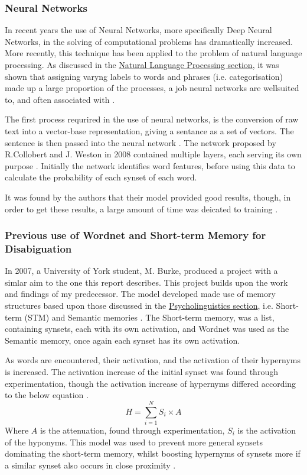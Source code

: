 \documentclass[]{article}
\begin{document}
\subsubsection{Neural Networks}
\label{sec:NeuralNetwork}
In recent years the use of Neural Networks, more specifically Deep Neural Networks, in the solving of computational problems has dramatically increased. More recently, this technique has been applied to the problem of natural language processing. As discussed in the \hyperref[sec:fNLP]{Natural Language Processing section}, it was shown that assigning varyng labels to words and phrases (i.e. categorisation) made up a large proportion of the processes, a job neural networks are wellsuited to, and often associated with \cite{NeuralNetworks}. 

The first process requrired in the use of neural networks, is the conversion of raw text into a vector-base representation, giving a sentance as a set of vectors. The sentence is then passed into the neural network \cite{NeuralNetworks}. The network proposed by R.Collobert and J. Weston in 2008 contained multiple layers, each serving its own purpose \cite{NeuralNetworks}. Initially the network identifies word features, before using this data to calculate the probability of each synset of each word.

It was found by the authors that their model provided good results, though, in order to get these results, a large amount of time was deicated to training \cite{NeuralNetworks}.

\subsubsection{Previous use of Wordnet and Short-term Memory for Disabiguation}
\label{sec:MattBurke}

In 2007, a University of York student, M. Burke, produced a project with a simlar aim to the one this report describes. This project builds upon the work and findings of my predecessor. The model developed made use of memory structures based upon those discussed in the \hyperref[sec:Psycholinguistics]{Psycholinguistics section}, i.e. Short-term (STM) and Semantic memories \cite{MattBurkePrevious}. The Short-term memory, was a list, containing synsets, each with its own activation, and Wordnet was used as the Semantic memory, once again each synset has its own activation.    

As words are encountered, their activation, and the activation of their hypernyms is increased. The activation increase of the initial synset was found through experimentation, though the activation increase of hypernyms differed according to the below equation \cite{MattBurkePrevious}. 
\[H = \sum\limits_{i=1}^N S_i \times A\]
Where \(A\) is the attenuation, found through experimentation, \(S_i\) is the activation of the hyponyms. This model was used to prevent more general synsets dominating the short-term memory, whilst boosting hypernyms of synsets more if a similar synset also occurs in close proximity \cite{MattBurkePrevious}.
\end{document}
